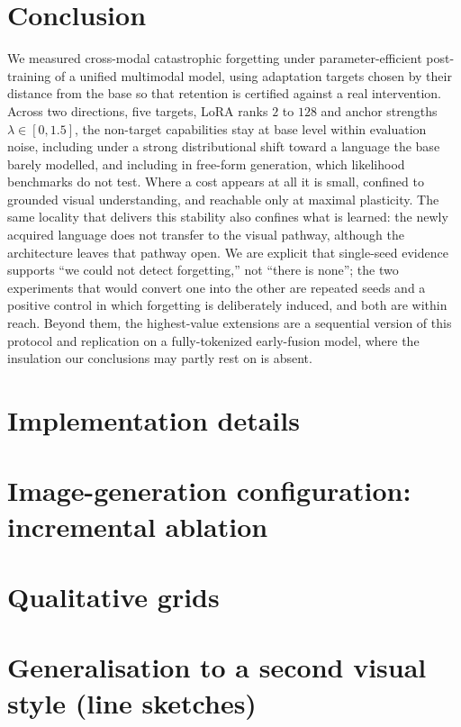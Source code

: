 \documentclass{article}
\begin{document}
\section{Conclusion}
We measured cross-modal catastrophic forgetting under parameter-efficient
post-training of a unified multimodal model, using adaptation targets chosen by
their distance from the base so that retention is certified against a real
intervention. Across two directions, five targets, LoRA ranks $2$ to $128$ and
anchor strengths $\lambda\in[0,1.5]$, the non-target capabilities stay at base
level within evaluation noise, including under a strong distributional shift
toward a language the base barely modelled, and including in free-form
generation, which likelihood benchmarks do not test. Where a cost appears at all
it is small, confined to grounded visual understanding, and reachable only at
maximal plasticity. The same locality that delivers this stability also confines
what is learned: the newly acquired language does not transfer to the visual
pathway, although the architecture leaves that pathway open. We are explicit that
single-seed evidence supports ``we could not detect forgetting,'' not ``there is
none''; the two experiments that would convert one into the other are repeated
seeds and a positive control in which forgetting is deliberately induced, and
both are within reach. Beyond them, the highest-value extensions are a sequential
version of this protocol and replication on a fully-tokenized early-fusion model,
where the insulation our conclusions may partly rest on is absent.




\appendix
\section{Implementation details}\label{app:impl}
\section{Image-generation configuration: incremental ablation}\label{app:ablation}
\section{Qualitative grids}\label{app:grids}
\section{Generalisation to a second visual style (line sketches)}\label{app:sketch}
\end{document}
